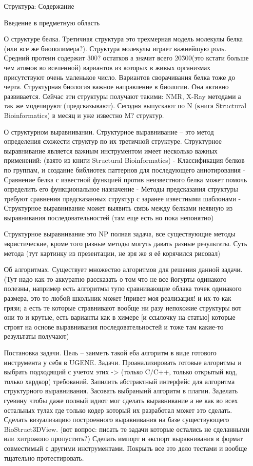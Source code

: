 \documentclass[utf8]{article}
\begin{document}
Структура:
Содержание

Введение в предметную область

О структуре белка.
Третичная структура это трехмерная модель молекулы белка (или все же биополимера?). Структура молекулы играет важнейшую роль. Средний протеин содержит 300? остатков а значит всего 20\^300(это кстати больше чем атомов во вселенной) вариантов из которых в живых организмах присутствуют очень маленькое число. Вариантов сворачивания белка тоже до черта. Структурная биология важное направление в биологии. Она активно развивается. Сейчас эти структуры получают такими: NMR, X-Ray методами а так же моделируют (предсказывают). Сегодня выпускают по N (книга Structural Bioinformatics) в месяц и уже известно M? структур.

О структурном выравнивании.
Структурное выравнивание -- это метод определения схожести структур по их третичной структуре.%
Структурное выравнивание является важным инструментом имеет несколько важных применений:
	(взято из книги Structural Bioinformatics)
	- Классификация белков по группам, и создание библиотек паттернов для последующего аннотирования
	- Сравнение белка с известной функцией против неизвестного белка может помочь определить его функциональное назначение 
	- Методы предсказания структуры требуют сравнения предсказанных структур с заранее известными шаблонами
	- Структурное выравнивание может выявить связь между белками неявную из выравнивания последовательностей (там еще есть но пока непонятно)

Структурное выравнивание это NP полная задача, все существующие методы эвристические, кроме того разные методы могуть давать разные результаты.
Суть метода (тут картинку из презентации, не зря же я её корячился рисовал)

Об алгоритмах.
Существует множество алгоритмов для решения данной задачи. (Тут надо как-то аккуратно рассказать о том что не все йогурты одинакого полезны, например есть алгоритмы тупо сравнивающие облака точек одинакого размера, это то любой школьник может !привет моя реализация! и их-то как грязи; а есть те которые стравнивают вообще ни разу непохожие структуры вот они то и крутые, есть варианты как в химере [и ссылочку на статью] которые строят на основе выравнивания последовательностей и тоже там какие-то результаты получают)
 
Постановка задачи.
Цель -- заиметь такой еба алгоритм в виде готового инструмента у себя в UGENE. 
Задачи.
Проанализировать готовые алгоритмы и выбрать подходящий с учетом этих -> (только C/C++, только открытый код, только хардкор) требований. Запилить абстрактный интерфейс для алгоритма структурного выравнивания. Засовать выбранынй алгоритм в плагин. Заделать гуевину чтобы даже полный идиот мог сделать выравнивание а не как во всех остальных тулах где только кодер который их разработал может это сделать. Сделать визуализацию построенного выравнивания на базе существующего BioStruct3DView. (вот вопрос: писать те задачи которые остались не сделанными или хитрожопо пропустить?) Сделать импорт и экспорт выравнивания в формат совместимый с другими инструментами. Покрыть все это дело тестами и вообще тщательно протестировать.
\end{document}
